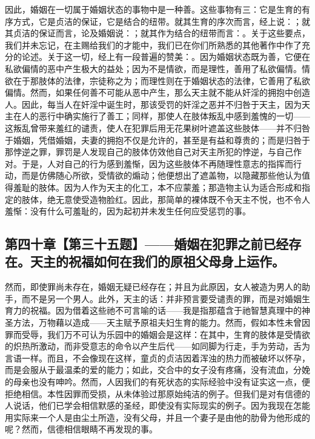 因此，婚姻在一切属于婚姻状态的事物中是一种善。这些事物有三：它是生育的有序方式，它是贞洁的保证，它是结合的纽带。就其生育的序次而言，经上说：；就其贞洁的保证而言，论及婚姻说：；就其作为结合的纽带而言：。关于这些要点，我们并未忘记，在主赐给我们的才能中，我们已在你们所熟悉的其他著作中作了充分的论述。关于这一切，经上有一段普遍的赞美：。因为婚姻状态既为善，它便在私欲偏情的恶中产生极大的益处；因为不是情欲，而是理性，善用了私欲偏情。情欲在于那肢体的法律，宗徒称之为；而理性则在于婚姻状态的法律，它善用了私欲偏情。然而，如果任何善不可能从恶中产生，那么天主就不能从奸淫的拥抱中创造人。因此，每当人在奸淫中诞生时，那该受罚的奸淫之恶并不归咎于天主，因为天主在人的恶行中确实施行了善工；同样，那使人在肢体叛乱中感到羞愧的一切——这叛乱曾带来羞红的谴责，使人在犯罪后用无花果树叶遮盖这些肢体——并不归咎于婚姻，凭借婚姻，夫妻的拥抱不仅是允许的，甚至是有益和尊贵的；而是归咎于那悖逆之罪，罪罚是人发现自己的肢体仿效他自己对天主所犯的悖逆，与自己作对。于是，人对自己的行为感到羞惭，因为这些肢体不再随理性意志的指挥而行动，而是仿佛随心所欲，受情欲的煽动；他便想出了遮盖物，以隐藏那些他认为值得羞耻的肢体。因为人作为天主的化工，本不应蒙羞；那造物主认为适合形成和指定的肢体，绝无意使受造物脸红。因此，那简单的裸体既不令天主不悦，也不令人羞惭：没有什么可羞耻的，因为起初并未发生任何应受惩罚的事。\par


\subsection{第四十章【第三十五题】——婚姻在犯罪之前已经存在。天主的祝福如何在我们的原祖父母身上运作。}

然而，即使罪尚未存在，婚姻无疑已经存在；并且为此原因，女人被造为男人的助手，而不是另一个男人。此外，天主的话：并非预言要受谴责的罪，而是对婚姻生育力的祝福。因为借着这些祂不可言喻的话——我是指那蕴含于祂智慧真理中的神圣方法，万物藉以造成——天主赋予原祖夫妇生育的能力。然而，假如本性未曾因罪而受辱，我们万不可认为乐园中的婚姻会是这样：在其中，生育的肢体是受情欲的炽热所激动，而非受意志的命令以产生后代——如同脚为行走，手为劳动，舌为言语一样。而且，不会像现在这样，童贞的贞洁因着浑浊的热力而被破坏以怀孕，而是会服从于最温柔的爱的能力；如此，交合中的女子没有疼痛，没有流血，分娩的母亲也没有呻吟。然而，人因我们的有死状态的实际经验中没有证实这一点，便拒绝相信。本性因罪而受损，从未体验过那原始纯洁的例子。但我们是对有信德的人说话，他们已学会相信默感的圣经，即使没有实际现实的例子。因为我现在怎能用实际来一个人是由尘土所造，没有父母，并且一个妻子是由他的肋骨为他形成的呢？然而，信德相信眼睛不再发现的事。\par

